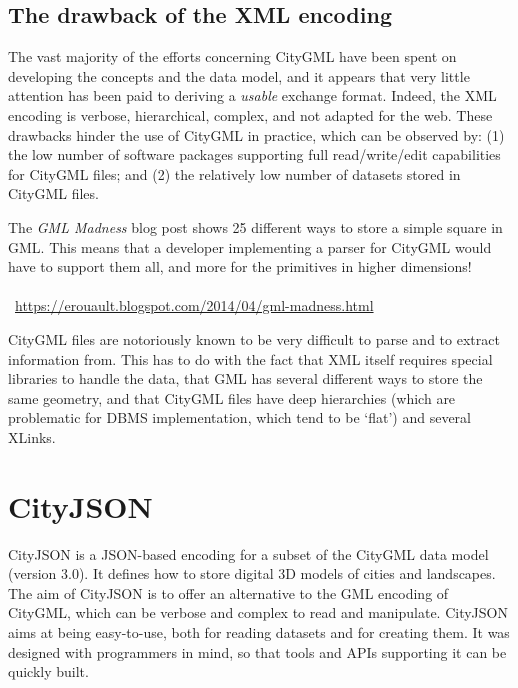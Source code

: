 

\subsection{The drawback of the XML encoding}

The vast majority of the efforts concerning CityGML have been spent on developing the concepts and the data model, and it appears that very little attention has been paid to deriving a \emph{usable} exchange format.
Indeed, the XML encoding is verbose, hierarchical, complex, and not adapted for the web.
These drawbacks hinder the use of CityGML in practice, which can be observed by: (1) the low number of software packages supporting full read/write/edit capabilities for CityGML files; and (2) the relatively low number of datasets stored in CityGML files.

\begin{kaobox-warning}[frametitle=\faExclamationTriangle\ GML madness]
  The \emph{GML Madness} blog post shows 25 different ways to store a simple square in GML\@. 
  This means that a developer implementing a parser for CityGML would have to support them all, and more for the primitives in higher dimensions! 
  \\ \\
  \faExternalLink\ \url{https://erouault.blogspot.com/2014/04/gml-madness.html}
\end{kaobox-warning}

CityGML files are notoriously known to be very difficult to parse and to extract information from.
This has to do with the fact that XML itself requires special libraries to handle the data, that GML has several different ways to store the same geometry, and that CityGML files have deep hierarchies (which are problematic for DBMS implementation, which tend to be `flat') and several XLinks.



\section{CityJSON}%

CityJSON is a JSON-based encoding for a subset of the  CityGML data model (version 3.0). 
It defines how to store digital 3D models of cities and landscapes. 
The aim of CityJSON is to offer an alternative to the GML encoding of CityGML, which can be verbose and complex to read and manipulate. 
CityJSON aims at being easy-to-use, both for reading datasets and for creating them. 
It was designed with programmers in mind, so that tools and APIs supporting it can be quickly built. 

